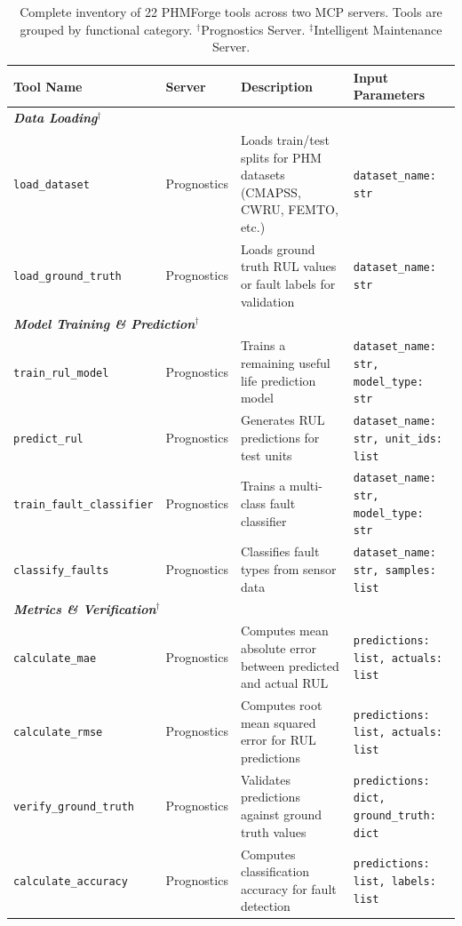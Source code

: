\begin{table}[ht]
\caption{Complete inventory of 22 PHMForge tools across two MCP servers. Tools are grouped by functional category. $^\dagger$Prognostics Server. $^\ddagger$Intelligent Maintenance Server.}
\label{tab:full_tools}
\centering
\small
\begin{tabular}{@{}llll@{}}
\toprule
\textbf{Tool Name} & \textbf{Server} & \textbf{Description} & \textbf{Input Parameters} \\
\midrule
\multicolumn{4}{l}{\textbf{\textit{Data Loading}}$^\dagger$} \\
\texttt{load\_dataset} & Prognostics & Loads train/test splits for PHM datasets (CMAPSS, CWRU, FEMTO, etc.) & \texttt{dataset\_name: str} \\
\texttt{load\_ground\_truth} & Prognostics & Loads ground truth RUL values or fault labels for validation & \texttt{dataset\_name: str} \\
\midrule
\multicolumn{4}{l}{\textbf{\textit{Model Training \& Prediction}}$^\dagger$} \\
\texttt{train\_rul\_model} & Prognostics & Trains a remaining useful life prediction model & \texttt{dataset\_name: str, model\_type: str} \\
\texttt{predict\_rul} & Prognostics & Generates RUL predictions for test units & \texttt{dataset\_name: str, unit\_ids: list} \\
\texttt{train\_fault\_classifier} & Prognostics & Trains a multi-class fault classifier & \texttt{dataset\_name: str, model\_type: str} \\
\texttt{classify\_faults} & Prognostics & Classifies fault types from sensor data & \texttt{dataset\_name: str, samples: list} \\
\midrule
\multicolumn{4}{l}{\textbf{\textit{Metrics \& Verification}}$^\dagger$} \\
\texttt{calculate\_mae} & Prognostics & Computes mean absolute error between predicted and actual RUL & \texttt{predictions: list, actuals: list} \\
\texttt{calculate\_rmse} & Prognostics & Computes root mean squared error for RUL predictions & \texttt{predictions: list, actuals: list} \\
\texttt{verify\_ground\_truth} & Prognostics & Validates predictions against ground truth values & \texttt{predictions: dict, ground\_truth: dict} \\
\texttt{calculate\_accuracy} & Prognostics & Computes classification accuracy for fault detection & \texttt{predictions: list, labels: list} \\

\end{tabular}
\end{table}
